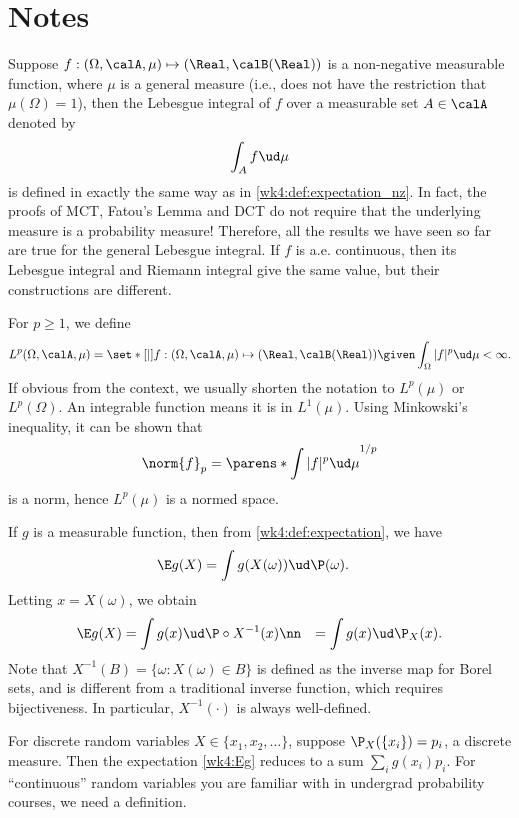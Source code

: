 \documentclass[../aipt.tex]{subfiles}
\begin{document}
\section{Notes}

Suppose $f : (\Omega, \calA, \mu) \mapsto (\Real, \calB(\Real))$ is a non-negative measurable function, where $\mu$ is a general measure (i.e., does not have the restriction that $\mu(\Omega)=1$), then the Lebesgue integral of $f$ over a measurable set $A \in \calA$ denoted by
\begin{align*}
\int_A f \ud\mu
\end{align*}
is defined in exactly the same way as in \cref{wk4:def:expectation_nz}. In fact, the proofs of MCT, Fatou's Lemma and DCT do not require that the underlying measure is a probability measure! Therefore, all the results we have seen so far are true for the general Lebesgue integral. If $f$ is a.e. continuous, then its Lebesgue integral and Riemann integral give the same value, but their constructions are different. 

For $p\geq 1$, we define
\begin{align*}
L^p(\Omega, \calA, \mu) = \set*[\vert]{ f : (\Omega, \calA, \mu) \mapsto (\Real, \calB(\Real)) \given \int_\Omega |f|^p \ud\mu < \infty}.
\end{align*}
If obvious from the context, we usually shorten the notation to $L^p(\mu)$ or $L^p(\Omega)$. An integrable function means it is in $L^1(\mu)$. Using Minkowski’s inequality, it can be shown that 
\begin{align*}
\norm{f}_p = \parens*{\int |f|^p \ud\mu}^{1/p}
\end{align*}
is a norm, hence $L^p(\mu)$ is a normed space.

If $g$ is a measurable function, then from  \cref{wk4:def:expectation}, we have
\begin{align*}
\E g(X) & =\int g(X(\omega)) \ud\P(\omega).
\end{align*}
Letting $x=X(\omega)$, we obtain
\begin{align}
\E g(X) & = \int g(x) \ud\P \circ X^{-1}(x)\nn
& = \int g(x) \ud\P_{X}(x). \label{wk4:Eg}
\end{align}
Note that $X^{-1}(B)=\{\omega :X(\omega) \in B\}$ is defined as the inverse map for Borel sets, and is different from a traditional inverse function, which requires bijectiveness. In particular, $X^{-1}(\cdot)$ is always well-defined.

For discrete random variables $X \in \{x_1,x_2,\ldots\}$, suppose $\P_X(\{x_i\})=p_i$, a discrete measure. Then the expectation \cref{wk4:Eg} reduces to a sum $\sum_{i}{g(x_i) p_i}$. For ``continuous'' random variables you are familiar with in undergrad probability courses, we need a definition.
\end{document}
